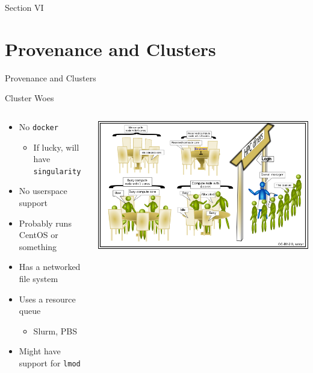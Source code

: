 \documentclass[bigger,unknownkeysallowed,aspectratio=169,red,colorblocks]{beamer}
\begin{document}
\begin{frame}[label={sec:org89be604},standout]{Section VI}
\section{Provenance and Clusters}
\begin{center}
  \Huge Provenance and Clusters
\end{center}
\end{frame}
\begin{frame}[label={sec:orge38abb4},fragile]{Cluster Woes}
 \begin{columns}
\begin{column}{0.4\columnwidth}
\begin{itemize}
\item No \texttt{docker}
\begin{itemize}
\item If lucky, will have \texttt{singularity}
\end{itemize}
\item No userspace support
\item Probably runs CentOS or something
\item Has a networked file system
\item Uses a resource queue
\begin{itemize}
\item Slurm, PBS
\end{itemize}
\item Might have support for \texttt{lmod}
\end{itemize}
\end{column}

\begin{column}{0.6\columnwidth}
\begin{center}
\includegraphics[width=.9\linewidth]{images/A_screenshot/2020-09-20_07-44-11_screenshot.png}
\end{center}
\end{column}
\end{columns}
\end{frame}
\end{document}

